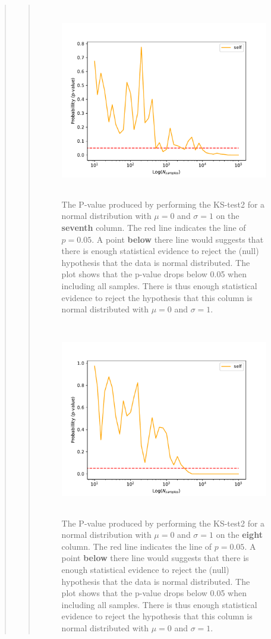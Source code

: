 \begin{quote}
\begin{quote}
\newpage

\begin{figure}[!ht]
\centering
\includegraphics[width=14cm, height=8.5cm]{./Plots/1e_plot_column_6.pdf}
\caption{The P-value produced by performing the KS-test2 for a normal distribution with $\mu = 0$ and $\sigma = 1$ on the \textbf{seventh} column.  The red line indicates the line of $ p = 0.05$. A point \textbf{below} there  line would suggests that there is enough statistical evidence to reject the (null) hypothesis that the data is normal distributed. The plot shows that the p-value drops below 0.05 when including all samples. There is thus enough statistical evidence to reject the hypothesis that this column is normal distributed with $\mu = 0$ and $\sigma = 1$.}
\end{figure}


\begin{figure}[!ht]
\centering
\includegraphics[width=14cm, height=8.5cm]{./Plots/1e_plot_column_7.pdf}
\caption{The P-value produced by performing the KS-test2 for a normal distribution with $\mu = 0$ and $\sigma = 1$ on the \textbf{eight} column.  The red line indicates the line of $ p = 0.05$. A point \textbf{below} there  line would suggests that there is enough statistical evidence to reject the (null) hypothesis that the data is normal distributed. The plot shows that the p-value drops below 0.05 when including all samples. There is thus enough statistical evidence to reject the hypothesis that this column is normal distributed with $\mu = 0$ and $\sigma = 1$.}
\end{figure}


\end{quote}
\end{quote}
